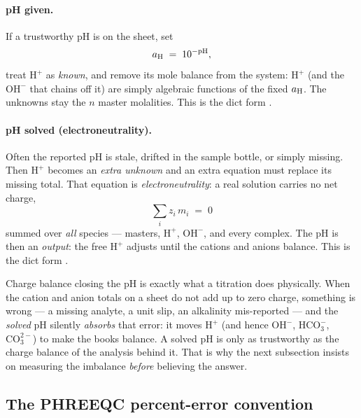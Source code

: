 \documentclass[11pt,a4paper]{article}
\begin{document}
\paragraph{pH given.}  If a trustworthy pH is on the sheet, set
\begin{equation}
   a_{\rm H} \;=\; 10^{-\mathrm{pH}},
   \label{eq:ph-given}
\end{equation}
treat $\text{H}^+$ as \emph{known}, and remove its mole balance from the
system: $\text{H}^+$ (and the $\text{OH}^-$ that chains off it) are
simply algebraic functions of the fixed $a_{\rm H}$.  The unknowns stay
the $n$ master molalities.  This is the dict form .

\paragraph{pH solved (electroneutrality).}  Often the reported pH is
stale, drifted in the sample bottle, or simply missing.  Then
$\text{H}^+$ becomes an \emph{extra unknown} and an extra equation must
replace its missing total.  That equation is \emph{electroneutrality}: a
real solution carries no net charge,
\begin{equation}
   \boxed{\;
   \sum_i z_i\,m_i \;=\; 0
   \;}
   \label{eq:electroneutrality}
\end{equation}
summed over \emph{all} species --- masters, $\text{H}^+$, $\text{OH}^-$,
and every complex.  The pH is then an \emph{output}: the free
$\text{H}^+$ adjusts until the cations and anions balance.  This is the
dict form .

\begin{intuition}
Charge balance closing the pH is exactly what a titration does
physically.  When the cation and anion totals on a sheet do not add up to
zero charge, something is wrong --- a missing analyte, a unit slip, an
alkalinity mis-reported --- and the \emph{solved} pH silently
\emph{absorbs} that error: it moves $\text{H}^+$ (and hence
$\text{OH}^-$, $\text{HCO}_3^-$, $\text{CO}_3^{2-}$) to make the books
balance.  A solved pH is only as trustworthy as the charge balance of the
analysis behind it.  That is why the next subsection insists on measuring
the imbalance \emph{before} believing the answer.
\end{intuition}

\subsection{The PHREEQC percent-error convention}
\end{document}
